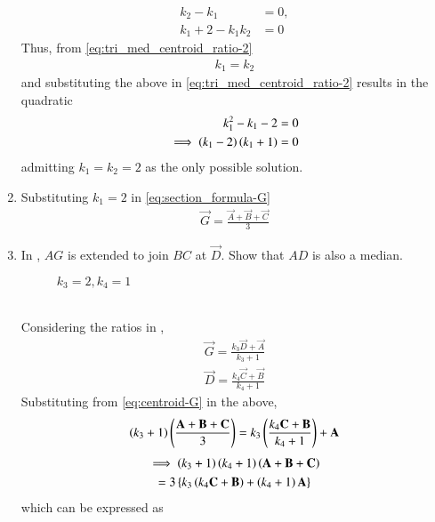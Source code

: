 \begin{enumerate}[label=\thesection.\arabic*.,ref=\thesection.\theenumi]
\begin{align}
\label{eq:tri_med_centroid_ratio-1}
	  k_2-k_1 &= 0,
	  \\
	  k_1 +2 - k_1k_2 &=0
\label{eq:tri_med_centroid_ratio-2}
  \end{align}
  Thus, from 
\eqref{eq:tri_med_centroid_ratio-2}
  \begin{align}
	  k_1=k_2
  \end{align}
  and substituting the above in 
\eqref{eq:tri_med_centroid_ratio-2} results in the quadratic
  \begin{align}
	  k_1^2 - k_1-2 &=0
	  \\
	  \implies 
	  \left(k_1-2\right)\left(k_1+1\right) &=0
  \end{align}
  admitting $k_1=k_2=2$ as the only possible solution.
  \item Substituting $k_1 =2 $ in 
	  \eqref{eq:section_formula-G}
  \begin{align}
	  \vec{G}=\frac{\vec{A}+\vec{B} + \vec{C}}{3}
	  \label{eq:centroid-G}
  \end{align}
\item 
In	,	
$AG$ is extended to join $BC$ at $\vec{D}$.  Show that $AD$ is also a median.
\begin{figure}[!ht]
	\begin{center}
		\resizebox{\columnwidth}{!}{}
	\end{center}
	\caption{$k_3 = 2, k_4 =1$}
	\label{fig:tri_med_meet}	
\end{figure}
	\\
	\solution Considering the ratios in 
	,	
  \begin{align}
\vec{G} = 
	  \frac{k_3\vec{D}+\vec{A} }{k_3+1} 
	  \\
	\vec{D}  =\frac{k_4\vec{C}+\vec{B} }{k_4+1} 
  \end{align}
  Substituting from 
	  \eqref{eq:centroid-G}
	  in the above, 
  \begin{align}
	  \left(k_3+1\right)\left(\frac{\mathbf{A}+\mathbf{B} + \mathbf{C}}{3}\right)
 = 
	  {k_3\left(\frac{k_4\mathbf{C}+\mathbf{B} }{k_4+1}\right) +\mathbf{A} } 
  \end{align}
\begin{multline}
	  \implies \left(k_3+1\right)\left(k_4+1\right)\left({\mathbf{A}+\mathbf{B} + \mathbf{C}}\right)
	  \\
 = 
	  {3} \left\{ {k_3\left({k_4\mathbf{C}+\mathbf{B} }\right) +\left(k_4+1\right)\mathbf{A} }\right\} 
\end{multline}
  which can be expressed as
  \begin{multline}

\end{multline}
\end{enumerate}
